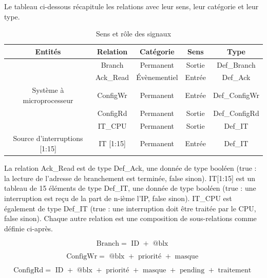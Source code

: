 Le tableau ci-dessous récapitule les relations avec leur sens, leur catégorie et leur type.

\begin{table}[H]
	\centering
	\begin{tabular}{|c|c|c|c|c|}
		\hline
		Entités                       & Relation  & Catégorie    & Sens   & Type          \\
		\hline
		                              & Branch    & Permanent    & Sortie & Def\_Branch   \\
		                              & Ack\_Read & Évènementiel & Entrée & Def\_Ack      \\
		Système à microprocesseur     & ConfigWr  & Permanent    & Entrée & Def\_ConfigWr \\
		                              & ConfigRd  & Permanent    & Sortie & Def\_ConfigRd \\
		                              & IT\_CPU   & Permanent    & Sortie & Def\_IT       \\
		\hline
		Source d'interruptions [1:15] & IT [1:15] & Permanent    & Entrée & Def\_IT       \\
		\hline
	\end{tabular}
	\caption{Sens et rôle des signaux}
	\label{tab:entrees_sorties_composant}
\end{table}

La relation Ack\_Read est de type Def\_Ack, une donnée de type booléen (true : la lecture de l'adresse de branchement est terminée, false sinon).
IT[1:15] est un tableau de 15 éléments de type Def\_IT, une donnée de type booléen (true : une interruption est reçu de la part de n-ième l'IP, false sinon).
IT\_CPU est également de type Def\_IT (true : une interruption doit être traitée par le CPU, false sinon).
Chaque autre relation est une composition de sous-relations comme définie ci-après.

\begin{equation*}
\mbox{Branch} = \mbox{ ID } + \mbox{ @blx }
\end{equation*}

\begin{equation*}
\mbox{ConfigWr} = \mbox{ @blx } + \mbox{ priorité } + \mbox{ masque }
\end{equation*}

\begin{equation*}
\mbox{ConfigRd} = \mbox{ ID } + \mbox{ @blx } + \mbox{ priorité } + \mbox{ masque } + \mbox{ pending } + \mbox{ traitement }
\end{equation*}

